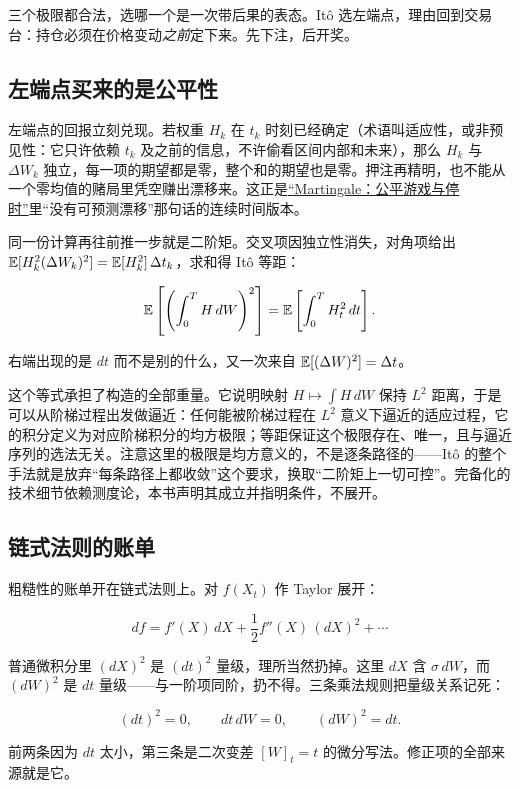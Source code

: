 三个极限都合法，选哪一个是一次带后果的表态。Itô 选左端点，理由回到交易台：持仓必须在价格变动\emph{之前}定下来。先下注，后开奖。

\subsection{左端点买来的是公平性}

左端点的回报立刻兑现。若权重 \(H_k\) 在 \(t_k\) 时刻已经确定（术语叫适应性，或非预见性：它只许依赖 \(t_k\) 及之前的信息，不许偷看区间内部和未来），那么 \(H_k\) 与 \(\Delta W_k\) 独立，每一项的期望都是零，整个和的期望也是零。押注再精明，也不能从一个零均值的赌局里凭空赚出漂移来。这正是\hyperref[sec:06-Random-Processes/04-Applications/02]{``Martingale：公平游戏与停时''}里``没有可预测漂移''那句话的连续时间版本。

同一份计算再往前推一步就是二阶矩。交叉项因独立性消失，对角项给出 \(\mathbb{E}[H_k^2(\Delta W_k)^2]=\mathbb{E}[H_k^2]\,\Delta t_k\)，求和得 Itô 等距：

\[
\mathbb{E}\left[\left(\int_{0}^{T} H\,dW\right)^2\right]=\mathbb{E}\left[\int_{0}^{T} H_t^2\,dt\right].
\]

右端出现的是 \(dt\) 而不是别的什么，又一次来自 \(\mathbb{E}[(\Delta W)^2]=\Delta t\)。

这个等式承担了构造的全部重量。它说明映射 \(H\mapsto\int H\,dW\) 保持 \(L^2\) 距离，于是可以从阶梯过程出发做逼近：任何能被阶梯过程在 \(L^2\) 意义下逼近的适应过程，它的积分定义为对应阶梯积分的均方极限；等距保证这个极限存在、唯一，且与逼近序列的选法无关。注意这里的极限是均方意义的，不是逐条路径的——Itô 的整个手法就是放弃``每条路径上都收敛''这个要求，换取``二阶矩上一切可控''。完备化的技术细节依赖测度论，本书声明其成立并指明条件，不展开。

\subsection{链式法则的账单}

粗糙性的账单开在链式法则上。对 \(f(X_t)\) 作 Taylor 展开：

\[
df=f'(X)\,dX+\frac12f''(X)\,(dX)^2+\cdots
\]

普通微积分里 \((dX)^2\) 是 \((dt)^2\) 量级，理所当然扔掉。这里 \(dX\) 含 \(\sigma\,dW\)，而 \((dW)^2\) 是 \(dt\) 量级——与一阶项同阶，扔不得。三条乘法规则把量级关系记死：

\[
(dt)^2=0,\qquad dt\,dW=0,\qquad (dW)^2=dt.
\]

前两条因为 \(dt\) 太小，第三条是二次变差 \([W]_t=t\) 的微分写法。修正项的全部来源就是它。

